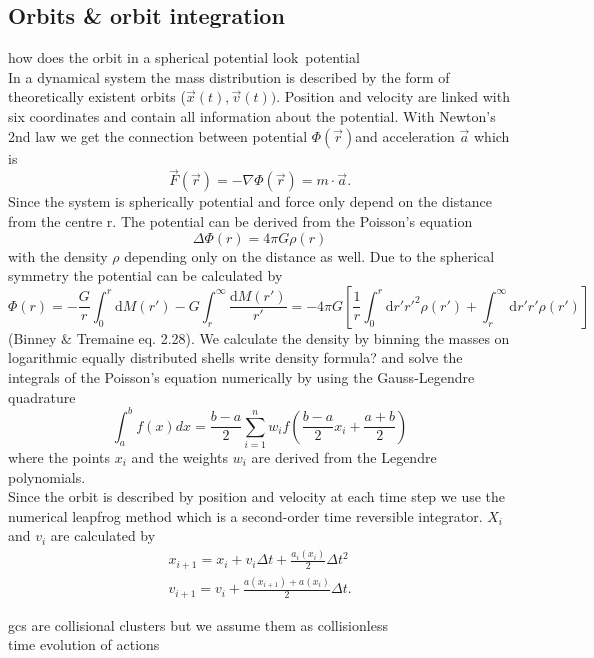 \subsection{Orbits \& orbit integration}\label{orbit_theory}
\color{red} how does the orbit in a spherical potential look\ potential\\ \color{black}
In a dynamical system the mass distribution is described by the form of theoretically existent orbits (\(\vec{x}(t),\vec{v}(t))\). Position and velocity are linked with six coordinates and contain all information about the potential. With Newton's 2nd law we get the connection between potential \(\Phi(\vec{r})\)and acceleration \(\vec{a}\) which is \[\vec{F}(\vec{r})=-\nabla\Phi(\vec{r})=m\cdot\vec{a}.\] Since the system is spherically potential and force only depend on the distance from the centre r. The potential can be derived from the Poisson's equation \begin{equation}\label{eq:Poisson}
\Delta\Phi(r)=4\pi G \rho(r)
\end{equation}
with the density \(\rho\) depending only on the distance as well. Due to the spherical symmetry the potential can be calculated by 
\begin{equation}
\Phi(r)=-\frac{G}{r}\int_0^r{\mathrm{d}M(r')}-G\int_r^{\infty}{\frac{\mathrm{d}M(r')}{r'}}=-4\pi G\left[\frac{1}{r}\int_0^r\mathrm{d}r'r'^2\rho(r')+\int_r^{\infty}\mathrm{d}r'r'\rho(r')\right]
\end{equation} (Binney \& Tremaine eq. 2.28). We calculate the density by binning the masses on logarithmic equally distributed shells \color{red} write density formula? \color{black} and solve the integrals of the Poisson's equation numerically by using the Gauss-Legendre quadrature \[\int_a^b f(x)dx = \frac{b-a}{2}\sum_{i=1}^n w_i f\left(\frac{b-a}{2}x_i+\frac{a+b}{2}\right)\] where the points \(x_i\) and the weights \(w_i\) are derived from the Legendre polynomials.\\ Since the orbit is described by position and velocity at each time step we use the numerical leapfrog method which is a second-order time reversible integrator. \(X_i\) and \(v_i\) are calculated by 
\begin{align*}
x_{i+1}=x_i+v_i\Delta t+\frac{a_i(x_i)}{2}\Delta t^2 \\
v_{i+1}=v_i+\frac{a(x_{i+1})+a(x_i)}{2}\Delta t.
\end{align*}

\color{red} gcs are collisional clusters but we assume them as collisionless \\ time evolution of actions \color{black}


